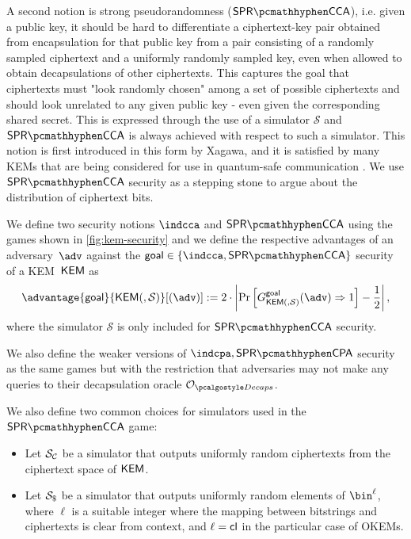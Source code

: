 A second notion is strong pseudorandomness ($\sprcca$), i.e. given a public key, it should be hard to differentiate a ciphertext-key pair obtained from encapsulation for that public key from a pair consisting of a randomly sampled ciphertext and a uniformly randomly sampled key, even when allowed to obtain decapsulations of other ciphertexts.
This captures the goal that ciphertexts must "look randomly chosen" among a set of possible ciphertexts and should look unrelated to any given public key - even given the corresponding shared secret.
This is expressed through the use of a simulator $\mathcal S$ and $\sprcca$ is always achieved with respect to such a simulator.
This notion is first introduced \cite{EC:Xagawa22} in this form by Xagawa, and it is satisfied by many KEMs that are being considered for use in quantum-safe communication \cite{EC:Xagawa22}. We use $\sprcca$ security as a stepping stone to argue about the distribution of ciphertext bits.

\begin{definition} \label{def:kem-security}
    We define two security notions $\indcca$ and $\sprcca$ using the games shown in \cref{fig:kem-security} and we define the respective advantages of an adversary~$\adv$ against the $\mathsf{goal} \in \{\indcca, \sprcca\}$ security of a KEM~$\mathsf{KEM}$ as
    \[
        \advantage{\mathsf{goal}}{\KEM(, \mathcal{S})}[(\adv)] := 2 \cdot \left| \Pr \left[ G^{\mathsf{goal}}_{\KEM(, \mathcal{S})}(\adv) \Rightarrow 1 \right] - \frac{1}{2} \right|,
    \]
    where the simulator $\mathcal{S}$ is only included for $\sprcca$ security.

    We also define the weaker versions of $\indcpa,\sprcpa$ security as the same games but with the restriction that adversaries may not make any queries to their decapsulation oracle $\decapsoracle$.

    We also define two common choices for simulators used in the $\sprcca$ game:
    \begin{itemize}
        \item Let $\mathcal{S}_\mathcal{C}$ be a simulator that outputs uniformly random ciphertexts from the ciphertext space of $\mathsf{KEM}$.
        \item Let $\simulbin$ be a simulator that outputs uniformly random elements of $\bin^\ell$, where $\ell$ is a suitable integer where the mapping between bitstrings and ciphertexts is clear from context, and $\ell = \mathsf{cl}$ in the particular case of OKEMs.
    \end{itemize}
\end{definition}

